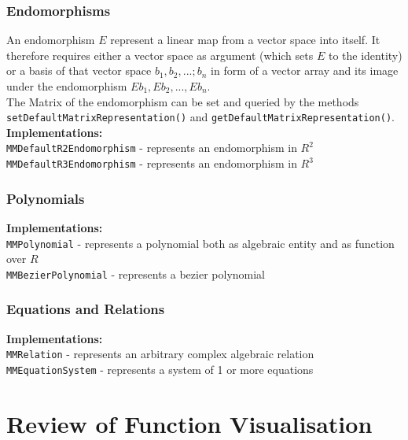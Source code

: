 \documentclass[a4paper,12pt]{book}
\begin{document}
\begin{appendix}
    \subsection{Endomorphisms}
	An endomorphism $E$ represent a linear map from a vector space into itself. It therefore requires either a
	vector space as argument (which sets $E$ to the identity) or a basis of that vector space $b_1, b_2,...;b_n$	
	in form of a vector array and its image under the endomorphism $Eb_1, Eb_2, ..., Eb_n$.\\
	The Matrix of the endomorphism can be set and queried by the methods \verb|setDefaultMatrixRepresentation()|
	and  \verb|getDefaultMatrixRepresentation()|.\\
      {\bf Implementations:}\\
        \verb|MMDefaultR2Endomorphism| - represents an endomorphism in $R^2$\\
        \verb|MMDefaultR3Endomorphism| - represents an endomorphism in $R^3$

    \subsection{Polynomials}
      {\bf Implementations:}\\
        \verb|MMPolynomial| - represents a polynomial both as algebraic entity and as function over $R$\\
        \verb|MMBezierPolynomial| - represents a bezier polynomial
    
    \subsection{Equations and Relations}
      {\bf Implementations:}\\
        \verb|MMRelation| - represents an arbitrary complex algebraic relation\\
        \verb|MMEquationSystem| - represents a system of 1 or more equations\\


\chapter{Review of Function Visualisation}


\end{appendix}
\end{document}
